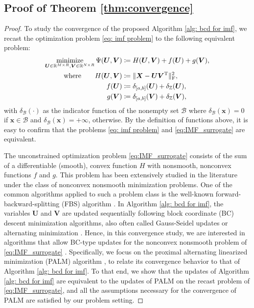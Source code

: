 \subsection{Proof of Theorem \ref{thm:convergence}} \label{app: proof:2}
\begin{proof}
    To study the convergence of the proposed Algorithm \ref{alg: bcd for imf}, we recast the optimization problem \eqref{eq: imf problem} to the following equivalent problem:
    \begin{align}
        \begin{split}
            \operatorname*{minimize}_{\bm U \in \mathbb{R}^{M\times R}, \bm V \in \mathbb{R}^{N\times R}} \Psi(\bm U, \bm V) &\coloneqq H(\bm U, \bm V) + f(\bm U) + g(\bm V),\\
            \text{where} \quad~~~ H(\bm U, \bm V) &\coloneqq \|\bm X - \bm U \bm V^{\rm T} \|_{\rm F}^2,\\
            f(\bm U) &\coloneqq \delta_{[a,b]}(\bm U) + \delta_\mathbb Z(\bm U),\\
            g(\bm V) &\coloneqq \delta_{[a,b]}(\bm V) + \delta_\mathbb Z(\bm V),
        \end{split}
        \label{eq:IMF_surrogate}
    \end{align}
    with $\delta_\mathcal{B}(\cdot)$ as the indicator function of the nonempty set $\mathcal{B}$ where $\delta_\mathcal{B}(\bm x) = 0$ if $\bm x \in \mathcal{B}$ and $\delta_\mathcal{B}(\bm x) = +\infty$, otherwise. By the definition of functions above, it is easy to confirm that the problems \eqref{eq: imf problem} and \eqref{eq:IMF_surrogate} are equivalent.
    
    The unconstrained optimization problem \eqref{eq:IMF_surrogate} consists of the sum of a differentiable (smooth), convex function $H$ with nonsmooth, nonconvex functions $f$ and $g$. This problem has been extensively studied in the literature under the class of nonconvex nonsmooth minimization problems.
    One of the common algorithms applied to such a problem class is the well-known forward-backward-splitting (FBS) algorithm \cite{combettes2011proximal,bauschke2017correction}.
    In Algorithm \ref{alg: bcd for imf}, the variables $\bm U$ and $\bm V$ are updated sequentially following block coordinate (BC) descent minimization algorithms, also often called Gauss-Seidel updates or alternating minimization \cite{nesterov2012efficiency,attouch2013convergence}.
    Hence, in this convergence study, we are interested in algorithms that allow BC-type updates for the nonconvex nonsmooth problem of \eqref{eq:IMF_surrogate} \cite{beck2013convergence,bolte2014proximal}. Specifically, we focus on the proximal alternating linearized minimization (PALM) algorithm \cite{bolte2014proximal}, to relate its convergence behavior to that of Algorithm \ref{alg: bcd for imf}.
    To that end, we show that the updates of Algorithm \ref{alg: bcd for imf} are equivalent to the updates of PALM on the recast problem of \eqref{eq:IMF_surrogate}, and all the assumptions necessary for the convergence of PALM are satisfied by our problem setting.


\end{proof}
